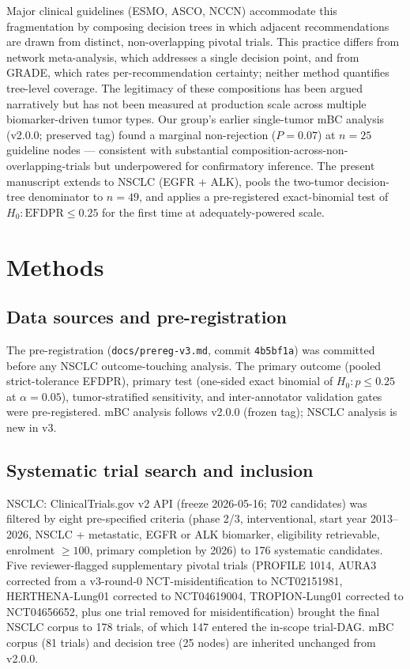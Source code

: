 \documentclass[11pt,a4paper]{article}
\begin{document}
Major clinical guidelines (ESMO, ASCO, NCCN) accommodate this fragmentation by composing decision trees in which adjacent recommendations are drawn from distinct, non-overlapping pivotal trials. This practice differs from network meta-analysis,\citep{rouse2017nma} which addresses a single decision point, and from GRADE,\citep{guyatt2008grade} which rates per-recommendation certainty; neither method quantifies tree-level coverage. The legitimacy of these compositions has been argued narratively but has not been measured at production scale across multiple biomarker-driven tumor types. Our group's earlier single-tumor mBC analysis (v2.0.0; preserved tag) found a marginal non-rejection ($P = 0.07$) at $n = 25$ guideline nodes --- consistent with substantial composition-across-non-overlapping-trials but underpowered for confirmatory inference. The present manuscript extends to NSCLC (EGFR + ALK), pools the two-tumor decision-tree denominator to $n = 49$, and applies a pre-registered\citep{munafo2017manifesto} exact-binomial test of $H_0: \mathrm{EFDPR} \le 0.25$ for the first time at adequately-powered scale.

\section{Methods}\label{sec:methods}

\subsection{Data sources and pre-registration}
The pre-registration (\texttt{docs/prereg-v3.md}, commit \texttt{4b5bf1a}) was committed before any NSCLC outcome-touching analysis. The primary outcome (pooled strict-tolerance EFDPR), primary test (one-sided exact binomial of $H_0: p \le 0.25$ at $\alpha = 0.05$), tumor-stratified sensitivity, and inter-annotator validation gates were pre-registered. mBC analysis follows v2.0.0 (frozen tag); NSCLC analysis is new in v3.

\subsection{Systematic trial search and inclusion}
NSCLC: ClinicalTrials.gov v2 API (freeze 2026-05-16; 702 candidates) was filtered by eight pre-specified criteria (phase 2/3, interventional, start year 2013--2026, NSCLC + metastatic, EGFR or ALK biomarker, eligibility retrievable, enrolment $\ge 100$, primary completion by 2026) to 176 systematic candidates. Five reviewer-flagged supplementary pivotal trials (PROFILE 1014, AURA3 corrected from a v3-round-0 NCT-misidentification to NCT02151981, HERTHENA-Lung01 corrected to NCT04619004, TROPION-Lung01 corrected to NCT04656652, plus one trial removed for misidentification) brought the final NSCLC corpus to 178 trials, of which 147 entered the in-scope trial-DAG. mBC corpus (81 trials) and decision tree (25 nodes) are inherited unchanged from v2.0.0.
\end{document}
